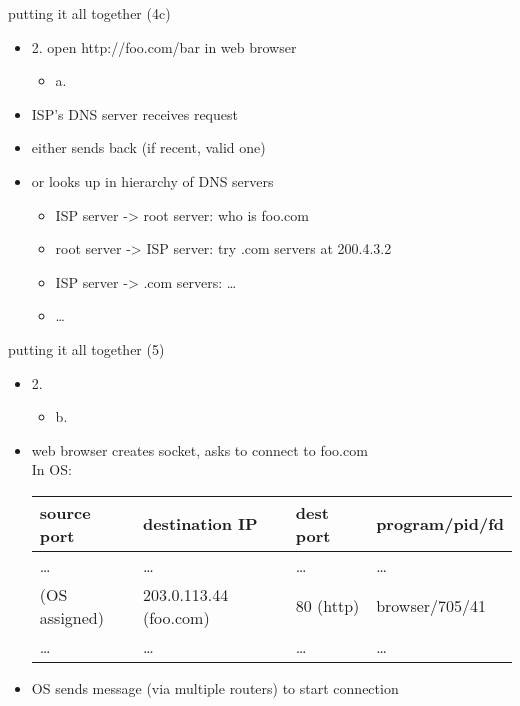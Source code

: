 \begin{frame}{putting it all together (4c)}
    \begin{itemize}
    \item 2. open http://foo.com/bar in web browser
        \begin{itemize}
        \item a. 
        \end{itemize}
    \vspace{.5cm}
    \item ISP's DNS server receives request
    \item either sends back  (if recent, valid one)
    \item or looks up in hierarchy of DNS servers
        \begin{itemize}
        \item ISP server -> root server: who is foo.com
        \item root server -> ISP server: try .com servers at 200.4.3.2
        \item ISP server -> .com servers: \ldots
        \item \ldots
        \end{itemize}
    \end{itemize}
\end{frame}

\begin{frame}{putting it all together (5)}
    \begin{itemize}
    \item 2. 
        \begin{itemize}
        \item b. 
        \end{itemize}
    \vspace{.5cm}
\begin{tikzpicture}
\end{tikzpicture}
    \item<2-> web browser creates socket, asks to connect to foo.com \\
    In OS:
\small
\begin{tabular}{llll}
source port & destination IP & dest port & program/pid/fd \\ \hline
\ldots & \ldots & \ldots & \ldots \\
(OS assigned) & 203.0.113.44 (foo.com) & 80 (http) & browser/705/41 \\
\ldots & \ldots & \ldots & \ldots \\
\end{tabular}
    \item<2-> OS sends message (via multiple routers) to start connection
    \end{itemize}
\end{frame}

